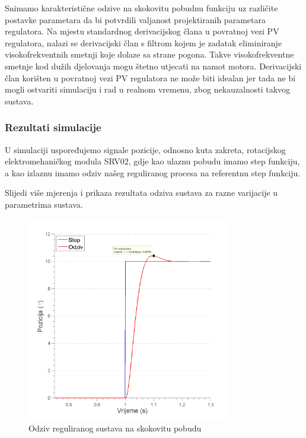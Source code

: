 \documentclass[12pt,a4paper]{article}
\begin{document}
Snimamo karakteristične odzive na skokovitu pobudnu funkciju uz različite postavke parametara da bi potvrdili valjanost projektiranih parametara regulatora. Na mjestu standardnog derivacijskog člana u povratnoj vezi PV regulatora, nalazi se derivacijski član s filtrom kojem je zadatak eliminiranje visokofrekventnih smetnji koje dolaze sa strane pogona. Takve visokofrekventne smetnje kod dužih djelovanja mogu štetno utjecati na namot motora. 
Derivacijski član korišten u povratnoj vezi PV regulatora ne može biti idealan jer tada ne bi mogli ostvariti simulaciju i rad u realnom vremenu, zbog nekauzalnosti takvog sustava.

\newpage

\subsubsection{Rezultati simulacije}

U simulaciji uspoređujemo signale pozicije, odnosno kuta zakreta, rotacijskog elektromehaničkog modula SRV02, gdje kao ulaznu pobudu imamo step funkciju, a kao izlaznu imamo odziv našeg reguliranog procesa na referentnu step funkciju.

Slijedi više mjerenja i prikaza rezultata odziva sustava za razne varijacije u parametrima sustava.

\begin{figure}[h]
	\begin{center}
	\includegraphics[width=0.8\textwidth] {odziv_1.png}
    \caption{Odziv reguliranog sustava na skokovitu pobudu}
    \end{center}
\end{figure}
\end{document}
